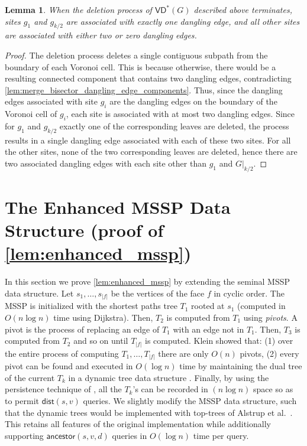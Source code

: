 \documentclass{article}
\newcommand{\dist}{\mathsf{dist}}
\newcommand{\ancestor}{\mathsf{ancestor}}
\newcommand{\VD}{\textsf{VD}}
\newtheorem{lemma}{Lemma}
\begin{document}
\begin{lemma}\label{lem:unique_connected_components}
When the deletion process of $\VD^*(G)$ described above terminates, sites $g_1$ and $g_{k/2}$ are associated with exactly one dangling edge, and all other sites are associated with either two or zero dangling edges.
\end{lemma}

\begin{proof}
The deletion process deletes a single contiguous subpath from the boundary of each Voronoi cell. This is because otherwise, there would be a resulting connected component that contains two dangling edges, contradicting \cref{lem:merge_bisector_dangling_edge_components}.
Thus, since the dangling edges associated with site $g_i$ are the dangling edges on the boundary of the Voronoi cell of $g_i$, each site is associated with at most two dangling edges.
Since for $g_1$ and $g_{k/2}$ exactly one of the corresponding leaves are deleted, the process results in a single dangling edge associated with each of these two sites.
For all the other sites, none of the two corresponding leaves are deleted, hence there are two associated dangling edges with  each site other than $g_1$ and $G|_{k/2}$.
\end{proof}







\appendix
\section{The Enhanced MSSP Data Structure (proof of \cref{lem:enhanced_mssp})}\label{sec:enhanced_mssp}


In this section we prove \cref{lem:enhanced_mssp} by extending the seminal MSSP data structure\cite{Klein02,CabelloCE13}.
Let $s_1,\ldots,s_{|f|}$ be the vertices of the face $f$ in cyclic order.
The MSSP is initialized with the shortest paths tree $T_1$ rooted at $s_1$ (computed in $O(n\log n)$ time using Dijkstra). Then, $T_2$ is computed from $T_1$ using {\em pivots}. A pivot is the process of replacing an edge of $T_1$ with an edge not in $T_1$.
Then, $T_3$ is computed from $T_2$ and so on until $T_{|f|}$ is computed.
Klein showed that: (1) over the entire process of computing $T_1,\ldots,T_{|f|}$ there are only $O(n)$ pivots, (2) every pivot can be found and executed in $O(\log n)$ time by maintaining the dual tree of the current $T_k$ in a dynamic tree data structure \cite{SleatorT83}.
Finally, by using the persistence technique of \cite{DriscollSST89}, all the $T_k$'s can be recorded in $(n \log n)$ space so as to permit $\dist(s,v)$ queries.
We slightly modify the MSSP data structure, such that the dynamic trees would be implemented with top-trees of Alstrup et al.~\cite{AHLT05}.
This retains all features of the original implementation while additionally supporting $\ancestor(s,v,d)$ queries in  $O(\log n)$ time per query.
\end{document}
